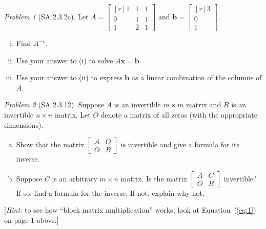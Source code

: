 \documentclass[fleqn,11pt]{paper}
\theoremstyle{remark}
\newtheorem{problem}{Problem}
\newtheorem*{solution}{{\bf Solution}}
\renewcommand{\vec}[1]{\mathbf{#1}}
\newcommand{\<}{\ensuremath{\langle}}
\renewcommand{\>}{\ensuremath{\rangle}}
\newcommand\vb{\vec{b}}
\newcommand\vx{\vec{x}}
\begin{document}
\begin{problem}[SA 2.3.2c]
  Let
  $A = \begin{bmatrix*}[r] 1&1&1\\0&1&1\\1&2&1\end{bmatrix*}$ 
    and 
    $\vb = \begin{bmatrix*}[r] 3\\0\\1\end{bmatrix*}$.
      \begin{enumerate}[(i)]
      \item Find $A^{-1}$.
      \item Use your answer to (i) to solve $A\vx = \vb$.
      \item Use your answer to (ii) to express $\vb$ as a linear combination of the columns of $A$.
      \end{enumerate}
\end{problem}
\newpage


\begin{problem}[SA 2.3.12]
  Suppose $A$ is an invertible $m \times m$ matrix and $B$ is an invertible 
  $n \times n$ matrix. Let $O$ denote a matrix of all zeros (with the appropriate
  dimensions).
 \begin{enumerate}[a.]
  \item 
    Show that the matrix
    $\left[ 
      \begin{array}{c|c}
        A &O \\ 
        \hline
        O &B
      \end{array}
      \right]$
    is invertible and give a formula for its inverse.

  \item Suppose $C$ is an arbitrary $m \times n$ matrix. Is the matrix
    $\left[ 
    \begin{array}{c|c}
      A &C \\ 
      \hline
      O &B
    \end{array}
    \right]$
    invertible? If so, find a formula for the inverse.  If not, explain why not.
  \end{enumerate}
  [{\it Hint:} to see how ``block matrix multiplication'' works,
    look at Equation~(\ref{eq:1}) on page 1 above.]
 
\end{problem}
\newpage
\end{document}
